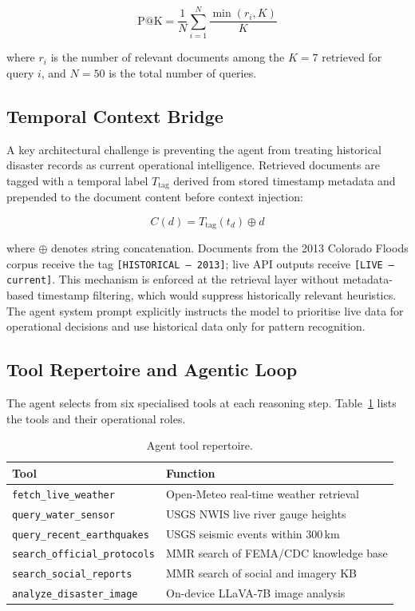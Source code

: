 \documentclass[conference]{IEEEtran}
\begin{document}
\begin{equation}
  \text{P@K} = \frac{1}{N}\sum_{i=1}^{N}\frac{\min(r_i,K)}{K}
  \label{eq:pak}
\end{equation}

\noindent where $r_i$ is the number of relevant documents among the $K{=}7$
retrieved for query $i$, and $N{=}50$ is the total number of queries.

\subsection{Temporal Context Bridge}

A key architectural challenge is preventing the agent from treating historical
disaster records as current operational intelligence. Retrieved documents are
tagged with a temporal label $T_{\text{tag}}$ derived from stored timestamp
metadata and prepended to the document content before context injection:

\begin{equation}
  C(d) = T_{\text{tag}}(t_d) \oplus d
  \label{eq:tcb}
\end{equation}

\noindent where $\oplus$ denotes string concatenation. Documents from the 2013
Colorado Floods corpus receive the tag \texttt{[HISTORICAL\,--\,2013]};
live API outputs receive \texttt{[LIVE\,--\,current]}. This mechanism is
enforced at the retrieval layer without metadata-based timestamp filtering,
which would suppress historically relevant heuristics. The agent system prompt
explicitly instructs the model to prioritise live data for operational decisions
and use historical data only for pattern recognition.

\subsection{Tool Repertoire and Agentic Loop}

The agent selects from six specialised tools at each reasoning step.
Table~\ref{tab:tools} lists the tools and their operational roles.

\begin{table}[ht]
\centering
\caption{Agent tool repertoire.}
\label{tab:tools}
\renewcommand{\arraystretch}{1.2}
\begin{tabular}{@{}ll@{}}
\toprule
\textbf{Tool} & \textbf{Function} \\ \midrule
\texttt{fetch\_live\_weather}      & Open-Meteo real-time weather retrieval \\
\texttt{query\_water\_sensor}      & USGS NWIS live river gauge heights \\
\texttt{query\_recent\_earthquakes}& USGS seismic events within 300\,km \\
\texttt{search\_official\_protocols}& MMR search of FEMA/CDC knowledge base \\
\texttt{search\_social\_reports}   & MMR search of social and imagery KB \\
\texttt{analyze\_disaster\_image}  & On-device LLaVA-7B image analysis \\ \bottomrule
\end{tabular}
\end{table}
\end{document}

